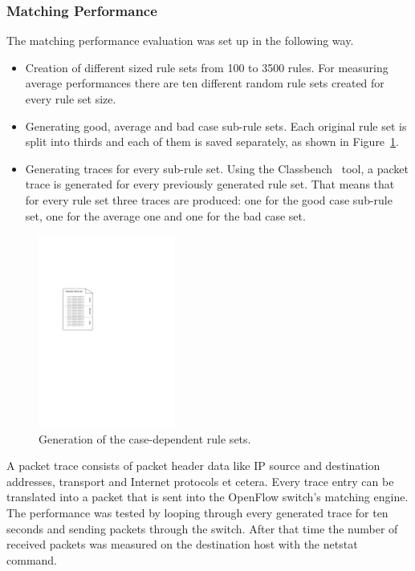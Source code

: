 \documentclass[a4paper,
		12pt,
		parskip=full,
		titlepage
		]{scrartcl}
\begin{document}
\subsubsection{Matching Performance}
The matching performance evaluation was set up in the following way.
\begin{itemize}
    \item Creation of different sized rule sets from 100 to 3500 rules.
        For measuring average performances there are ten different random rule sets created for every rule set size.
    \item Generating good, average and bad case sub-rule sets. 
        Each original rule set is split into thirds and each of them is saved separately, 
        as shown in Figure~\ref{fig:rule-thirds}.
    \item Generating traces for every sub-rule set.
        Using the Classbench~\cite{classbench_website} tool, a packet trace is generated for every previously generated rule set.
        That means that for every rule set three traces are produced: 
        one for the good case sub-rule set, one for the average one and one for the bad case set.
\end{itemize}

\begin{figure}
\centering
\includegraphics[width=0.4\textwidth]{images/rule-thirds}
\caption{Generation of the case-dependent rule sets.}
\label{fig:rule-thirds}
\end{figure}

A packet trace consists of packet header data like IP source and destination addresses, transport and Internet protocols et cetera.
Every trace entry can be translated into a packet that is sent into the OpenFlow switch's matching engine.
The performance was tested by looping through every generated trace for ten seconds and sending packets through the switch.
After that time the number of received packets was measured on the destination host with the \textsf{netstat} command.
\end{document}
